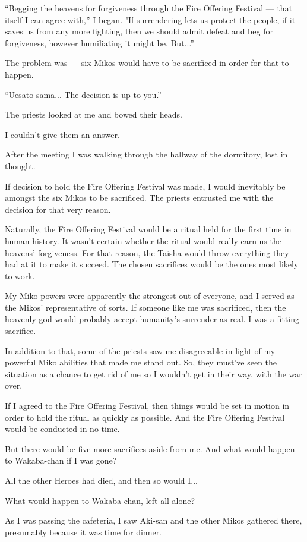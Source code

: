 ``Begging the heavens for forgiveness through the Fire Offering Festival --- that itself I can agree with,'' I began. "If surrendering lets us protect the people, if it saves us from any more fighting, then we should admit defeat and beg for forgiveness, however humiliating it might be. But...''

The problem was --- six Mikos would have to be sacrificed in order for that to happen.

``Uesato-sama... The decision is up to you.''

The priests looked at me and bowed their heads.

I couldn't give them an answer.

After the meeting I was walking through the hallway of the dormitory, lost in thought.

If decision to hold the Fire Offering Festival was made, I would inevitably be amongst the six Mikos to be sacrificed. The priests entrusted me with the decision for that very reason.

Naturally, the Fire Offering Festival would be a ritual held for the first time in human history. It wasn't certain whether the ritual would really earn us the heavens' forgiveness. For that reason, the Taisha would throw everything they had at it to make it succeed. The chosen sacrifices would be the ones most likely to work.

My Miko powers were apparently the strongest out of everyone, and I served as the Mikos' representative of sorts. If someone like me was sacrificed, then the heavenly god would probably accept humanity's surrender as real. I was a fitting sacrifice.

In addition to that, some of the priests saw me disagreeable in light of my powerful Miko abilities that made me stand out. So, they must've seen the situation as a chance to get rid of me so I wouldn't get in their way, with the war over.

If I agreed to the Fire Offering Festival, then things would be set in motion in order to hold the ritual as quickly as possible. And the Fire Offering Festival would be conducted in no time.

But there would be five more sacrifices aside from me. And what would happen to Wakaba-chan if I was gone?

All the other Heroes had died, and then so would I...

What would happen to Wakaba-chan, left all alone?

As I was passing the cafeteria, I saw Aki-san and the other Mikos gathered there, presumably because it was time for dinner.

